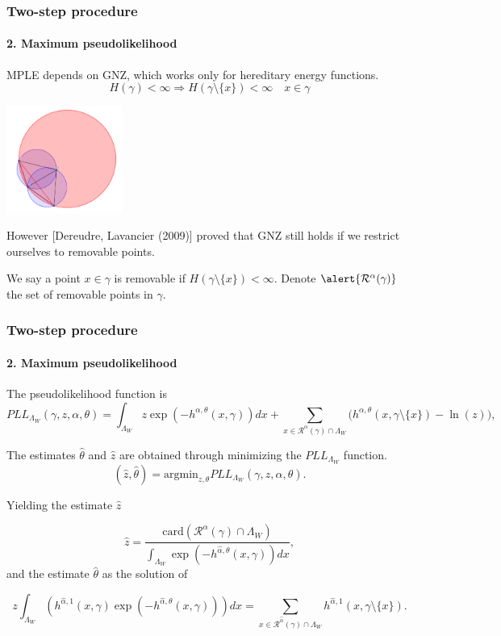 \documentclass[c, 10pt]{beamer}
\begin{document}
\begin{frame}\frametitle{Two-step procedure}\framesubtitle{2. Maximum pseudolikelihood}
MPLE depends on GNZ, which works only for \alert{hereditary} energy functions.
$$H(\gamma) < \infty \Rightarrow H(\gamma \setminus \{x\}) < \infty \quad x \in \gamma$$

\begin{center}
\includegraphics[height = 3.5cm]{./FigureLayout/hereditarity.png}
\end{center}

However [Dereudre, Lavancier (2009)] proved that GNZ still holds if we restrict ourselves to \alert{removable points}.\newline

We say a point $x\in \gamma$ is removable if $H(\gamma \setminus \{x\}) < \infty$. Denote $\alert {\mathcal R^\alpha(\gamma)}$ the set of removable points in $\gamma$. 


\end{frame}

\begin{frame}\frametitle{Two-step procedure}\framesubtitle{2. Maximum pseudolikelihood}
\begin{small}
The pseudolikelihood function is
$$ PLL_{\Lambda_W}(\gamma,z,\alpha, \theta) = \int_{\Lambda_W } z \exp (-h^{\alpha,\theta}(x,\gamma)) dx + \sum_{x\in\mathcal R^\alpha(\gamma)\cap \Lambda_W } \big(h^{\alpha,\theta}(x,\gamma\setminus\{x\}) - \ln(z)\big),
$$


The estimates $\hat\theta$ and $\hat z$ are obtained through minimizing the $PLL_{\Lambda_W }$ function. 
$$(\hat z, \hat\theta) = \text{argmin}_{z,\theta} PLL_{\Lambda_W } (\gamma, z, \hat\alpha,\theta).$$

Yielding the estimate $\hat z$ 

$$\hat z = \frac{\mbox{card}(\mathcal R^\alpha(\gamma)\cap \Lambda_W)}{\int_{\Lambda_W} \exp{\left( -h^{\hat\alpha,\theta}(x,\gamma)\right)} dx},$$
and the estimate $\hat\theta$ as the solution of

$$z \int_{\Lambda_W} (h^{\hat\alpha,1}(x,\gamma)\exp{\left(-h^{\hat\alpha,\theta}(x,\gamma)\right)}) dx = \sum_{x \in \mathcal R^{\hat\alpha}(\gamma)\cap \Lambda_W} h^{\hat\alpha,1}(x,\gamma\setminus\{x\}).$$

\end{small}
\end{frame}
\end{document}
